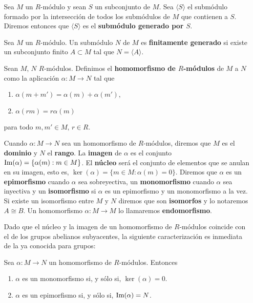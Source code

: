 \begin{definicion}
	Sea \(M\) un \(R\)-módulo y sean \(S\) un subconjunto de \(M\). Sea
	\(\langle S \rangle\) el submódulo formado por la intersección de todos los
	submódulos de \(M\) que contienen a \(S\). Diremos entonces que \(\langle S \rangle\)
	es el \textbf{submódulo generado por \(S\)}.
\end{definicion}

\begin{definicion}
	Sea \(M\) un \(R\)-módulo. Un submódulo \(N\) de \(M\) es \textbf{finitamente generado}
	si existe un subconjunto finito \(A \subset M\) tal que \(N = \langle A \rangle\).
\end{definicion}

\begin{definicion}
	Sean \(M\), \(N\) \(R\)-módulos. Definimos el \textbf{homomorfismo de \(R\)-módulos}
	de \(M\) a \(N\) como la aplicación \(\alpha: M \rightarrow N\) tal que
	\begin{enumerate}
		\item \(\alpha(m+m') = \alpha(m) + \alpha(m')\),
		
		\item \(\alpha(rm) = r\alpha(m)\)
	\end{enumerate}
	para todo \(m,m' \in M\), \(r \in R\).
\end{definicion}

Cuando \(\alpha: M \rightarrow N\) sea un homomorfismo de \(R\)-módulos, diremos que
\(M\) es el \textbf{dominio} y \(N\) el \textbf{rango}. La \textbf{imagen} de
\(\alpha\) es el conjunto \(\operatorname{Im}(\alpha) = \{ \alpha(m) : m \in M \}\). El \textbf{núcleo}
será el conjunto de elementos que se anulan en su imagen, esto es,
\(\ker(\alpha) = \{ m \in M : \alpha(m) = 0 \}\). Diremos que \(\alpha\) es un \textbf{epimorfismo}
cuando \(\alpha\) sea sobreyectiva, un \textbf{monomorfismo} cuando \(\alpha\) sea
inyectiva y un \textbf{isomorfismo} si \(\alpha\) es un epimorfismo y un monomorfismo
a la vez. Si existe un isomorfismo entre \(M\) y \(N\) diremos que son \textbf{isomorfos}
y lo notaremos \(A \cong B\). Un homomorfismo \(\alpha: M \rightarrow M\) lo
llamaremos \textbf{endomorfismo}.

Dado que el núcleo y la imagen de un homomorfismo de \(R\)-módulos coincide con el
de los grupos abelianos subyacentes, la siguiente caracterización es inmediata
de la ya conocida para grupos:

\begin{proposicion}
	Sea \(\alpha: M \to N\) un homomorfismo de \(R\)-módulos. Entonces
	\begin{enumerate}
		\item \(\alpha\) es un monomorfismo si, y sólo si, \(\ker(\alpha) = 0\).
		
		\item \(\alpha\) es un epimorfismo si, y sólo si, \(\operatorname{Im}(\alpha) = N\).
	\end{enumerate}
\end{proposicion}

